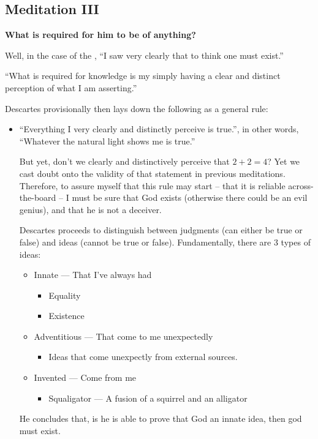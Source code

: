 \documentclass{article}
\begin{document}
    \begin{spacing}{1.2}
    \newpage
    \section{Meditation III}
    \textbf{What is required for him to be  of anything?}

    Well, in the case of the , ``I saw very clearly that to 
    think one must exist.''

    ``What is required for knowledge is my simply having a clear and distinct 
    perception of what I am asserting.''
    
    Descartes provisionally then lays down the following as a general rule:
    \begin{itemize}
        \item ``Everything I very clearly and distinctly perceive is true.'', 
        in other words, ``Whatever the natural light shows me is true.''
        
        But yet, don't we clearly and distinctively perceive that \(2+2=4\)?
        Yet we cast doubt onto the validity of that statement in previous 
        meditations. Therefore, to assure myself that this rule may start 
        -- that it is reliable across-the-board -- I must be sure that God 
        exists (otherwise there could be an evil genius), and that he is not a 
        deceiver.

        Descartes proceeds to distinguish between judgments (can either be true or false) and ideas (cannot be true or false). Fundamentally, there are 
        3 types of ideas:
        \begin{itemize}
            \item Innate --- That I've always had
            \begin{itemize}
                \item Equality
                \item Existence
            \end{itemize}
            \item Adventitious --- That come to me unexpectedly
            \begin{itemize}
                \item Ideas that come unexpectly from external sources.
            \end{itemize}
            \item Invented --- Come from me
            \begin{itemize}
                \item Squaligator --- A fusion of a squirrel and an alligator
            \end{itemize}
        \end{itemize}
        He concludes that, is he is able to prove that God an innate idea, then 
        god must exist. 


\end{itemize}
\end{spacing}
\end{document}
